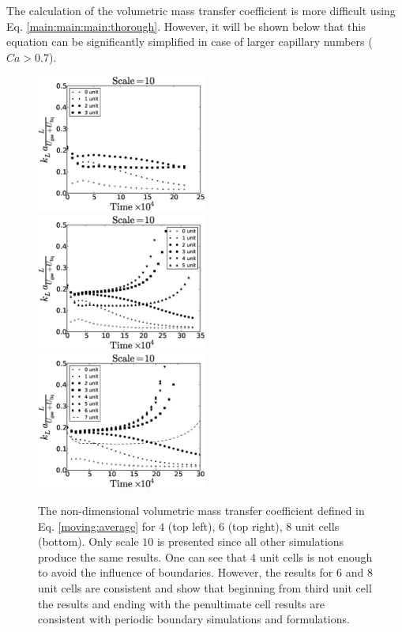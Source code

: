 \documentclass[preprint,12pt]{elsarticle}
\begin{document}
The calculation of the  volumetric mass transfer coefficient is more difficult
using Eq. \ref{main:main:main:thorough}. However, it will be shown below that
this equation can be significantly simplified in case of larger capillary
numbers ($Ca>0.7$).

\begin{figure}[htb!]
\includegraphics[width=0.5\textwidth]{aver_moving_window4scale10.eps}
\includegraphics[width=0.5\textwidth]{aver_moving_window6scale10.eps}\\
\includegraphics[width=0.5\textwidth]{aver_moving_window8scale10.eps}
\caption{The non-dimensional volumetric mass transfer coefficient defined in Eq.
\ref{moving:average} for $4$ (top left), $6$ (top right), $8$ unit cells (bottom). Only scale
$10$ is presented since all other simulations produce the same results. One can see that $4$ unit
cells is not enough to avoid the influence of boundaries. However, the results for $6$ and $8$
unit cells are consistent and show that beginning from third unit cell the results and ending with
the penultimate cell results are consistent with periodic boundary simulations and
\citet{vanbaten-circular} formulations.
\label{fig:moving:average:ca0097}}
\end{figure}
\end{document}
